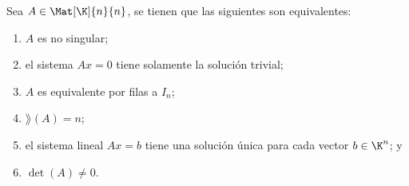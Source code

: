 \documentclass[a4,11pt]{aleph-notas}
\begin{document}
\begin{teo}
    
    Sea $A \in \Mat[\K]{n}{n}$, se tienen que las siguientes son equivalentes:
    \begin{enumerate}
    \item 
        $A$ es no singular;
    \item 
        el sistema $Ax=0$ tiene solamente la solución trivial;
    \item 
        $A$ es equivalente por filas a $I_n$;
    \item 
        $\rang(A)=n$; 
    \item 
        el sistema lineal $Ax=b$ tiene una solución única para cada vector $b \in \K^{n}$; y
    \item 
        $\det(A) \neq 0$.
    \end{enumerate}
\end{teo}
\end{document}
